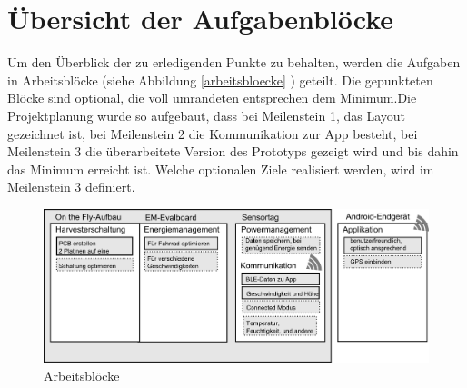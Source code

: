 \section{Übersicht der Aufgabenblöcke}

Um den Überblick der zu erledigenden Punkte zu behalten, werden die Aufgaben in Arbeitsblöcke (siehe Abbildung \ref{arbeitsbloecke} ) geteilt. Die gepunkteten Blöcke sind optional, die voll umrandeten entsprechen dem Minimum.Die Projektplanung wurde so aufgebaut, dass bei Meilenstein 1, das Layout gezeichnet ist, bei Meilenstein 2 die Kommunikation zur App besteht, bei Meilenstein 3 die überarbeitete Version des Prototyps gezeigt wird und bis dahin das Minimum erreicht ist. Welche optionalen Ziele realisiert werden, wird im Meilenstein 3 definiert.

\begin{figure}[h]
    \includegraphics[width=15cm]{../ressources/Projektorganisation/Arbeitsbloecke.png} 
    \caption{Arbeitsblöcke}
\end{figure}\label{arbeitsbloecke} 

